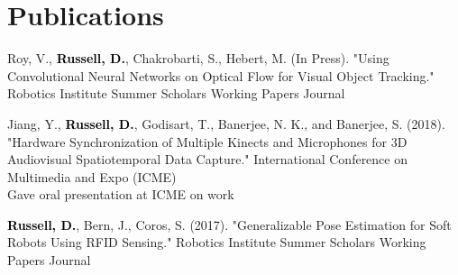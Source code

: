 \documentclass[]{deedy-resume-openfont}
\begin{document}
%


\sectionsep
\section{Publications}
\fontsize{10pt}{10pt}\selectfont
Roy, V., \textcolor{black}{\selectfont\bfseries Russell, D.}, Chakrobarti, S., Hebert, M. (In Press). "Using Convolutional Neural Networks on Optical Flow for Visual Object Tracking." Robotics Institute Summer Scholars Working Papers Journal

\vspace{.5em}
Jiang, Y., \textcolor{black}{\selectfont\bfseries Russell, D.}, Godisart, T., Banerjee, N. K., and Banerjee, S. (2018). "Hardware Synchronization of Multiple Kinects and Microphones for 3D Audiovisual Spatiotemporal Data Capture." International Conference on Multimedia and Expo (ICME)\\
\vspace{.15em}
  \textbullet{} Gave oral presentation at ICME on work

\vspace{.5em}
\textcolor{black}{\selectfont\bfseries Russell, D.}, Bern, J., Coros, S. (2017). "Generalizable Pose Estimation for Soft Robots Using RFID Sensing." Robotics Institute Summer Scholars Working Papers Journal 



\end{document}
